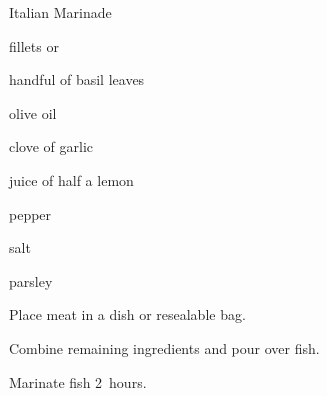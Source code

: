 \begin{recipe}{Italian Marinade}{}{}

\begin{ingredients}
\item {} fillets or 
\item handful of basil leaves
\item {} olive oil
\item clove of garlic
\item juice of half a lemon
\item pepper
\item salt
\item parsley
\end{ingredients}

\begin{directions}
\item Place meat in a dish or resealable bag.
\item Combine remaining ingredients and pour over fish.
\item Marinate fish 2~hours.
\end{directions}

\end{recipe}
